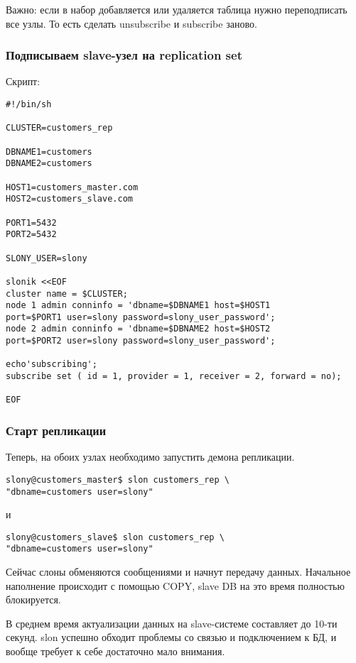 Важно: если в набор добавляется или удаляется таблица нужно переподписать все узлы.
То есть сделать unsubscribe и subscribe заново.

\subsubsection{Подписываем slave-узел на replication set}
Скрипт:
\begin{lstlisting}[label=lst:slony10,caption=Подписываем slave-узел на replication set]
#!/bin/sh

CLUSTER=customers_rep

DBNAME1=customers
DBNAME2=customers

HOST1=customers_master.com
HOST2=customers_slave.com

PORT1=5432
PORT2=5432

SLONY_USER=slony

slonik <<EOF
cluster name = $CLUSTER;
node 1 admin conninfo = 'dbname=$DBNAME1 host=$HOST1
port=$PORT1 user=slony password=slony_user_password';
node 2 admin conninfo = 'dbname=$DBNAME2 host=$HOST2
port=$PORT2 user=slony password=slony_user_password';

echo'subscribing';
subscribe set ( id = 1, provider = 1, receiver = 2, forward = no);

EOF
\end{lstlisting}

\subsubsection{Старт репликации}
Теперь, на обоих узлах необходимо запустить демона репликации.
\begin{lstlisting}[label=lst:slony11,caption=Старт репликации]
slony@customers_master$ slon customers_rep \
"dbname=customers user=slony"
\end{lstlisting}

и
\begin{lstlisting}[label=lst:slony12,caption=Старт репликации]
slony@customers_slave$ slon customers_rep \
"dbname=customers user=slony"
\end{lstlisting}

Сейчас слоны обменяются сообщениями и начнут передачу данных. Начальное наполнение происходит с помощью COPY,
slave DB на это время полностью блокируется.

В среднем время актуализации данных на slave-системе составляет до 10-ти секунд.
slon успешно обходит проблемы со связью и подключением к БД, и вообще требует к
себе достаточно мало внимания.

